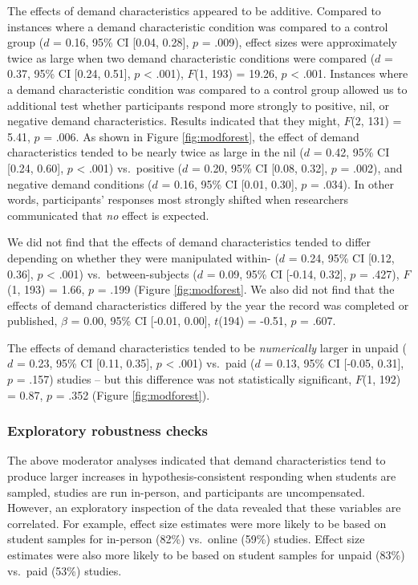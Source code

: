 \documentclass[
  man,floatsintext]{apa6}
\begin{document}
The effects of demand characteristics appeared to be additive. Compared to instances where a demand characteristic condition was compared to a control group (\(d\) = 0.16, 95\% CI {[}0.04, 0.28{]}, \(p\) = .009), effect sizes were approximately twice as large when two demand characteristic conditions were compared (\(d\) = 0.37, 95\% CI {[}0.24, 0.51{]}, \(p\) \textless{} .001), \(F\)(1, 193) = 19.26, \(p\) \textless{} .001. Instances where a demand characteristic condition was compared to a control group allowed us to additional test whether participants respond more strongly to positive, nil, or negative demand characteristics. Results indicated that they might, \(F\)(2, 131) = 5.41, \(p\) = .006. As shown in Figure \ref{fig:modforest}, the effect of demand characteristics tended to be nearly twice as large in the nil (\(d\) = 0.42, 95\% CI {[}0.24, 0.60{]}, \(p\) \textless{} .001) vs.~positive (\(d\) = 0.20, 95\% CI {[}0.08, 0.32{]}, \(p\) = .002), and negative demand conditions (\(d\) = 0.16, 95\% CI {[}0.01, 0.30{]}, \(p\) = .034). In other words, participants' responses most strongly shifted when researchers communicated that \emph{no} effect is expected.

We did not find that the effects of demand characteristics tended to differ depending on whether they were manipulated within- (\(d\) = 0.24, 95\% CI {[}0.12, 0.36{]}, \(p\) \textless{} .001) vs.~between-subjects (\(d\) = 0.09, 95\% CI {[}-0.14, 0.32{]}, \(p\) = .427), \(F\)(1, 193) = 1.66, \(p\) = .199 (Figure \ref{fig:modforest}. We also did not find that the effects of demand characteristics differed by the year the record was completed or published, \(\beta\) = 0.00, 95\% CI {[}-0.01, 0.00{]}, \(t\)(194) = -0.51, \(p\) = .607.

The effects of demand characteristics tended to be \emph{numerically} larger in unpaid (\(d\) = 0.23, 95\% CI {[}0.11, 0.35{]}, \(p\) \textless{} .001) vs.~paid (\(d\) = 0.13, 95\% CI {[}-0.05, 0.31{]}, \(p\) = .157) studies -- but this difference was not statistically significant, \(F\)(1, 192) = 0.87, \(p\) = .352 (Figure \ref{fig:modforest}).

\hypertarget{exploratory-robustness-checks}{%
\subsubsection{Exploratory robustness checks}\label{exploratory-robustness-checks}}

The above moderator analyses indicated that demand characteristics tend to produce larger increases in hypothesis-consistent responding when students are sampled, studies are run in-person, and participants are uncompensated. However, an exploratory inspection of the data revealed that these variables are correlated. For example, effect size estimates were more likely to be based on student samples for in-person (82\%) vs.~online (59\%) studies. Effect size estimates were also more likely to be based on student samples for unpaid (83\%) vs.~paid (53\%) studies.
\end{document}
